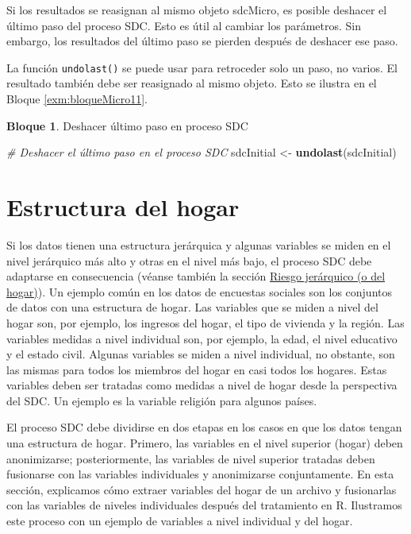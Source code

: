 \documentclass[]{book}
\newenvironment{Shaded}{\begin{snugshade}}{\end{snugshade}}
\newcommand{\CommentTok}[1]{\textcolor[rgb]{0.56,0.35,0.01}{\textit{#1}}}
\newcommand{\KeywordTok}[1]{\textcolor[rgb]{0.13,0.29,0.53}{\textbf{#1}}}
\newcommand{\NormalTok}[1]{#1}
\newcommand{\StringTok}[1]{\textcolor[rgb]{0.31,0.60,0.02}{#1}}
\theoremstyle{definition}
\theoremstyle{definition}
\newtheorem{example}{Bloque}[chapter]
\theoremstyle{definition}
\theoremstyle{definition}
\theoremstyle{remark}
\begin{document}
Si los resultados se reasignan al mismo objeto sdcMicro, es posible deshacer el último paso del proceso SDC. Esto es útil al cambiar los parámetros. Sin embargo, los resultados del último paso se pierden después de deshacer ese paso.

La función \texttt{undolast()} se puede usar para retroceder solo un paso, no varios. El resultado también debe ser reasignado al mismo objeto. Esto se ilustra en el Bloque \ref{exm:bloqueMicro11}.

\begin{example}
\protect\hypertarget{exm:bloqueMicro11}{}{\label{exm:bloqueMicro11} }Deshacer último paso en proceso SDC
\end{example}

\begin{Shaded}
\begin{Highlighting}[]
\CommentTok{# Deshacer el último paso en el proceso SDC}
\NormalTok{sdcInitial <-}\StringTok{ }\KeywordTok{undolast}\NormalTok{(sdcInitial)}
\end{Highlighting}
\end{Shaded}

\hypertarget{estructura-del-hogar}{%
\section{Estructura del hogar}\label{estructura-del-hogar}}

Si los datos tienen una estructura jerárquica y algunas variables se miden en el nivel jerárquico más alto y otras en el nivel más bajo, el proceso SDC debe adaptarse en consecuencia (véanse también la sección \protect\hyperlink{riesgo-jeruxe1rquico-o-del-hogar}{Riesgo jerárquico (o del hogar)}). Un ejemplo común en los datos de encuestas sociales son los conjuntos de datos con una estructura de hogar. Las variables que se miden a nivel del hogar son, por ejemplo, los ingresos del hogar, el tipo de vivienda y la región. Las variables medidas a nivel individual son, por ejemplo, la edad, el nivel educativo y el estado civil. Algunas variables se miden a nivel individual, no obstante, son las mismas para todos los miembros del hogar en casi todos los hogares. Estas variables deben ser tratadas como medidas a nivel de hogar desde la perspectiva del SDC. Un ejemplo es la variable religión para algunos países.

El proceso SDC debe dividirse en dos etapas en los casos en que los datos tengan una estructura de hogar. Primero, las variables en el nivel superior (hogar) deben anonimizarse; posteriormente, las variables de nivel superior tratadas deben fusionarse con las variables individuales y anonimizarse conjuntamente. En esta sección, explicamos cómo extraer variables del hogar de un archivo y fusionarlas con las variables de niveles individuales después del tratamiento en R. Ilustramos este proceso con un ejemplo de variables a nivel individual y del hogar.
\end{document}

